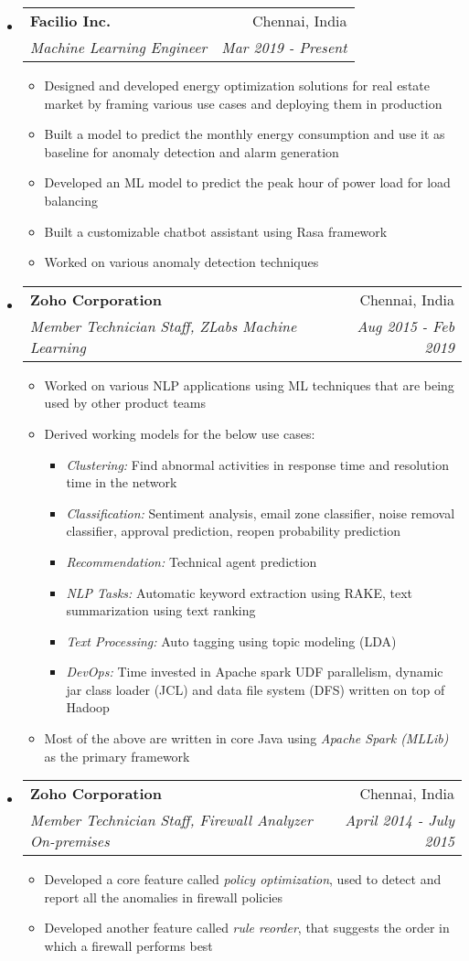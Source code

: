 \documentclass[letterpaper,11pt]{article}
\makeatletter
\newcommand{\resitem}[1]{\item #1 \vspace{-2pt}}
\newcommand{\resheading}[1]{\textbf{\sffamily{\mbox{~}{\large #1} \vphantom{p\^{E}}}}}
\newcommand{\ressubheading}[4]{
\begin{tabular*}{6.5in}{l@{\extracolsep{\fill}}r}
		\textbf{#1} & #2 \\
		\textit{#3} & \textit{#4} \\
\end{tabular*}\vspace{-6pt}}
\makeatother
\begin{document}
\vspace{0.05in}
\resheading{Work Experience}
\vspace{-2mm}
\begin{itemize}
\item[]
	\ressubheading{Facilio Inc.}{Chennai, India}{Machine Learning Engineer}{Mar 2019 - Present}
	\begin{itemize}
		\resitem{Designed and developed energy optimization solutions for real estate market by framing various use cases and deploying them in production}
		\resitem{Built a model to predict the monthly energy consumption and use it as baseline for anomaly detection and alarm generation}
		\resitem{Developed an ML model to predict the peak hour of power load for load balancing}
		\resitem{Built a customizable chatbot assistant using Rasa framework}
		\resitem{Worked on various anomaly detection techniques}
	\end{itemize}

\item[]
	\ressubheading{Zoho Corporation}{Chennai, India}{Member Technician Staff, ZLabs Machine Learning}{Aug 2015 - Feb 2019}
	\begin{itemize}
		\resitem{Worked on various NLP applications using ML techniques that are being used by other product teams}
		\resitem{{Derived working models for the below use cases:}}
		\begin{itemize}
			\resitem{\textit{Clustering:} Find abnormal activities in response time and resolution time in the network}
			\resitem{\textit{Classification:} Sentiment analysis, email zone classifier, noise removal classifier, approval prediction, reopen probability prediction}
			\resitem{\textit{Recommendation:} Technical agent prediction}
			\resitem{\textit{NLP Tasks:} Automatic keyword extraction using RAKE, text summarization using text ranking}
			\resitem{\textit{Text Processing:} Auto tagging using topic modeling (LDA)}
			\resitem{\textit{DevOps:} Time invested in Apache spark UDF parallelism, dynamic jar class loader (JCL) and data file system (DFS) written on top of Hadoop}

		\end{itemize}
		\resitem{Most of the above are written in core Java using \textit{Apache Spark (MLLib)} as the primary framework}
	\end{itemize}
	
\item[]
	\ressubheading{Zoho Corporation}{Chennai, India}{Member Technician Staff, Firewall Analyzer On-premises}{April 2014 - July 2015}
	\begin{itemize}
		\resitem{Developed a core feature called \textit{policy optimization}, used to detect and report all the anomalies in firewall policies}
		\resitem{Developed another feature called \textit{rule reorder}, that suggests the order in which a firewall performs best}


\end{itemize}
\end{itemize}
\end{document}
